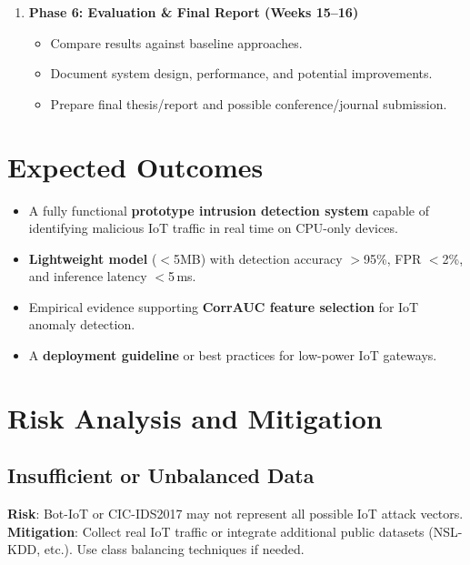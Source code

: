 \documentclass[12pt]{article}
\begin{document}
\begin{enumerate}
    \item \textbf{Phase 6: Evaluation \& Final Report (Weeks 15--16)}
    \begin{itemize}
        \item Compare results against baseline approaches.
        \item Document system design, performance, and potential improvements.
        \item Prepare final thesis/report and possible conference/journal submission.
    \end{itemize}
\end{enumerate}


\section{Expected Outcomes}

\begin{itemize}
    \item A fully functional \textbf{prototype intrusion detection system} capable of identifying malicious IoT traffic in real time on CPU-only devices.
    \item \textbf{Lightweight model} ($<$5MB) with detection accuracy $>$95\%, FPR $<$2\%, and inference latency $<$5\,ms.
    \item Empirical evidence supporting \textbf{CorrAUC feature selection} for IoT anomaly detection.
    \item A \textbf{deployment guideline} or best practices for low-power IoT gateways.
\end{itemize}


\section{Risk Analysis and Mitigation}

\subsection{Insufficient or Unbalanced Data}
\textbf{Risk}: Bot-IoT or CIC-IDS2017 may not represent all possible IoT attack vectors.\\
\textbf{Mitigation}: Collect real IoT traffic or integrate additional public datasets (NSL-KDD, etc.). 
Use class balancing techniques if needed.
\end{document}
